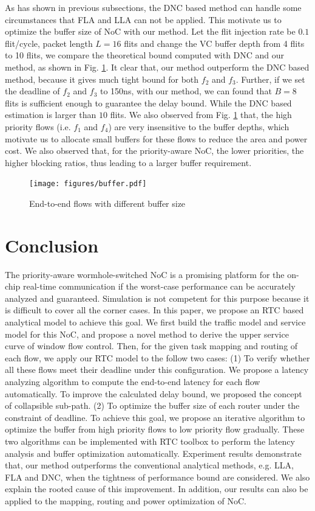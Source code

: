 \documentclass[10pt,journal]{IEEEtran}
\begin{document}
As has shown in previous subsections, the DNC based method \cite{Qian489900} can handle some circumstances that FLA and LLA can not be applied. This motivate us to optimize the buffer size of NoC with our method. Let the flit injection rate be $0.1$ flit/cycle, packet length $L=16$ flits and change the VC buffer depth from 4 flits to 10 flits, we compare the theoretical bound computed with DNC and our method, as shown in Fig. \ref{buffer}. It clear that, our method outperform the DNC based method, because it gives much tight bound for both $f_2$ and $f_3$. Further, if we set the deadline of $f_2$ and $f_3$ to 150ns, with our method, we can found that $B=8$ flits is sufficient enough to guarantee the delay bound. While the DNC based estimation is larger than $10$ flits. We also observed from Fig. \ref{buffer} that, the high priority flows (i.e. $f_1$ and $f_4$) are very insensitive to the buffer depths, which motivate us to allocate small buffers for these flows to reduce the area and power cost. We also observed that, for the priority-aware NoC, the lower priorities, the higher blocking ratios, thus leading to a larger buffer requirement.
\begin{figure}
  \centering
  \texttt{[image: figures/buffer.pdf]}\\
  \caption{End-to-end flows with different buffer size}\label{buffer}
\end{figure}

\section{Conclusion}\label{conclusion}
The priority-aware wormhole-switched NoC is a promising platform for the on-chip real-time communication if the worst-case performance can be accurately analyzed and guaranteed. Simulation is not competent for this purpose because it is difficult to cover all the corner cases. In this paper, we propose an RTC based analytical model to achieve this goal. We first build the traffic model and service model for this NoC, and propose a novel method to derive the upper service curve of window flow control. Then, for the given task mapping and routing of each flow, we apply our RTC model to the follow two cases: (1) To verify whether all these flows meet their deadline under this configuration. We propose a latency analyzing algorithm to compute the end-to-end latency for each flow automatically. To improve the calculated delay bound, we proposed the concept of collapsible sub-path. (2) To optimize the buffer size of each router under the constraint of deadline. To achieve this goal, we propose an iterative algorithm to optimize the buffer from high priority flows to low priority flow gradually. These two algorithms can be implemented with RTC toolbox to perform the latency analysis and buffer optimization automatically. Experiment results demonstrate that, our method outperforms the conventional analytical methods, e.g. LLA, FLA and DNC, when the tightness of performance bound are considered. We also explain the rooted cause of this improvement. In addition, our results can also be applied to the mapping, routing and power optimization of NoC.
\end{document}
